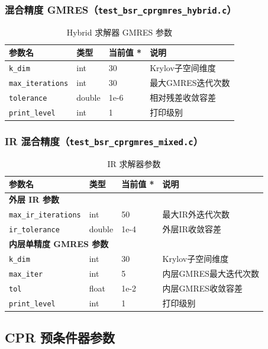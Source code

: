 \documentclass[12pt,a4paper]{article}
\begin{document}
\subsubsection*{混合精度 GMRES（\texttt{test\_bsr\_cprgmres\_hybrid.c}）}

\begin{table}[htbp]
\centering
\caption{Hybrid 求解器 GMRES 参数}
\label{tab:params_hybrid_gmres}
\begin{tabular}{llll}
\toprule
参数名 & 类型 & 当前值 * & 说明 \\
\midrule
\texttt{k\_dim} & int & 30 & Krylov子空间维度 \\
\texttt{max\_iterations} & int & 30 & 最大GMRES迭代次数 \\
\texttt{tolerance} & double & 1e-6 & 相对残差收敛容差 \\
\texttt{print\_level} & int & 1 & 打印级别 \\
\bottomrule
\end{tabular}
\end{table}

\subsubsection*{IR 混合精度（\texttt{test\_bsr\_cprgmres\_mixed.c}）}

\begin{table}[htbp]
\centering
\caption{IR 求解器参数}
\label{tab:params_ir}
\begin{tabular}{llll}
\toprule
参数名 & 类型 & 当前值 * & 说明 \\
\midrule
\multicolumn{4}{l}{\textbf{外层 IR 参数}} \\
\texttt{max\_ir\_iterations} & int & 50 & 最大IR外迭代次数 \\
\texttt{ir\_tolerance} & double & 1e-4 & 外层IR收敛容差 \\
\multicolumn{4}{l}{\textbf{内层单精度 GMRES 参数}} \\
\texttt{k\_dim} & int & 30 & Krylov子空间维度 \\
\texttt{max\_iter} & int & 5 & 内层GMRES最大迭代次数 \\
\texttt{tol} & float & 1e-2 & 内层GMRES收敛容差 \\
\texttt{print\_level} & int & 1 & 打印级别 \\
\bottomrule
\end{tabular}
\end{table}

\subsection{CPR 预条件器参数}
\end{document}
